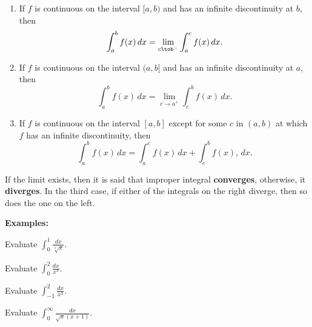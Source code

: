\documentclass[addpoints, 12pt]{exam}
\begin{document}
\begin{tcolorbox}[title= DEFINITION OF IMPROPER INTEGRALS WITH INFINITE DISCONTINUITIES,black,sharp corners,colback=white,colbacktitle=white,coltitle=black]

    \begin{enumerate}
        \item If $f$ is continuous on the interval $[a,b)$ and has an infinite discontinuity at $b$, then 
        \[\int_a^b f(x)\,dx=\lim_{c\tob^-}\int_a^c f(x)\,dx.\]
        \item If $f$ is continuous on the interval $(a,b]$ and has an infinite discontinuity at $a$, then 
        \[\int_a^b f(x)\,dx=\lim_{c\to a^+}\int_c^b f(x)\,dx.\]
        \item If $f$ is continuous on the interval $[a,b]$ except for some $c$ in $(a,b)$ at which $f$ has an infinite discontinuity, then 
        \[\int_a^b f(x)\,dx=\int_{a}^c f(x)\,dx + \int_c^{b} f(x),\,dx.\]
    \end{enumerate}
    
    If the limit exists, then it is said that improper integral \textbf{converges}, otherwise, it \textbf{diverges}. In the third case, if either of the integrals on the right diverge, then so does the one on the left.

\end{tcolorbox}


\textbf{Examples:}
\begin{questions}
    \begin{minipage}{.45\linewidth}
        \question Evaluate $\displaystyle\int_0^1\frac{dx}{\sqrt[3]{x}}$.    
    \end{minipage}
    \hfill
    \begin{minipage}{.45\linewidth}
        \question Evaluate $\displaystyle\int_0^2\frac{dx}{x^3}$.
    \end{minipage}
    
    
    \question Evaluate $\displaystyle\int_{-1}^2\frac{dx}{x^3}$.
    
    
    \newpage
    
    \question Evaluate $\displaystyle\int_0^\infty\frac{dx}{\sqrt{x}(x+1)}.$
    
\end{questions}
\end{document}
